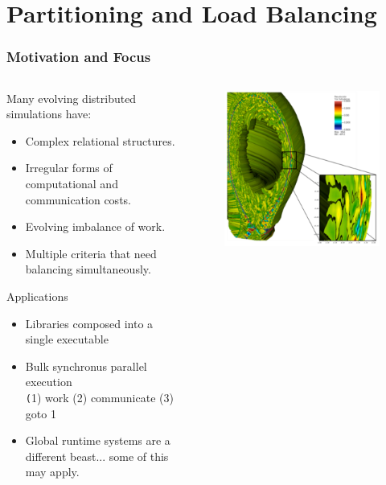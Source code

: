 \documentclass[aspectratio=169]{beamer}
\begin{document}
\section{Partitioning and Load Balancing}
\begin{frame}
  \frametitle{Motivation and Focus}
  \begin{columns}
    \begin{column}{0.7\textwidth}
      Many evolving distributed simulations have: \\
      \begin{itemize}
        \item Complex relational structures.
        \item Irregular forms of computational and communication costs.
        \item Evolving imbalance of work. %
        \item Multiple criteria that need balancing simultaneously.
      \end{itemize}
      Applications
      \begin{itemize}
        \item Libraries composed into a single executable
        \item Bulk synchronus parallel execution \\
          {\small \texttt (1) work (2) communicate (3) goto 1}
        \item Global runtime systems are a different beast... some of this may apply.
      \end{itemize}
    \end{column}
    \begin{column}{0.3\textwidth}
      \begin{figure}
        \centering
        \includegraphics[width=.75\textwidth]{figures/xgcCase.png} \\

\end{figure}
\end{column}
\end{columns}
\end{frame}
\end{document}
